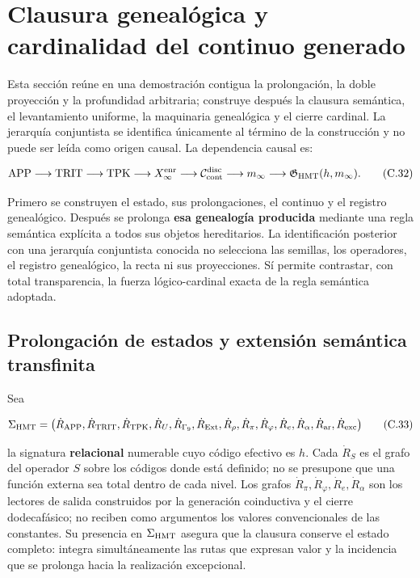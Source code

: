\section{Clausura genealógica y cardinalidad del continuo generado}
\label{sec:cierre-cardinal-nativo}

Esta sección reúne en una demostración contigua la prolongación, la doble
proyección y la profundidad arbitraria; construye después la clausura
semántica, el levantamiento uniforme, la maquinaria genealógica y el cierre
cardinal. La jerarquía conjuntista se identifica únicamente al término de la
construcción y no puede ser leída como origen causal. La dependencia causal es:

\[
 \mathrm{APP}\longrightarrow\mathrm{TRIT}\longrightarrow\mathrm{TPK}
 \longrightarrow X_\infty^{\rm enr}
 \longrightarrow\mathcal C_{\rm cont}^{\rm disc}
 \longrightarrow m_\infty
 \longrightarrow\mathfrak G_{\rm HMT}(h,m_\infty).
\tag{C.32}\label{eq:ch-cadena-causal}
\]

Primero se construyen el estado, sus prolongaciones, el continuo y el registro genealógico.
Después se prolonga \textbf{esa genealogía producida} mediante una regla semántica
explícita a todos sus objetos hereditarios. La identificación posterior con
una jerarquía conjuntista conocida no selecciona las semillas, los operadores,
el registro genealógico, la recta ni sus proyecciones. Sí permite contrastar, con total
transparencia, la fuerza lógico-cardinal exacta de la regla semántica adoptada.

\subsection{Prolongación de estados y extensión semántica transfinita}

Sea

\[
 \Sigma_{\rm HMT}
 =\bigl(\dot R_{\rm APP},\dot R_{\rm TRIT},\dot R_{\rm TPK},
 \dot R_{U},\dot R_{\Gamma_9},\dot R_{\rm Ext},\dot R_\rho,
 \dot R_{\pi},\dot R_{\varphi},\dot R_e,\dot R_{\alpha},
 \dot R_{\rm ar},\dot R_{\rm exc}\bigr)
\tag{C.33}\label{eq:ch-signatura}
\]

la signatura \textbf{relacional} numerable cuyo código efectivo es \(h\). Cada
\(\dot R_S\) es el grafo del operador \(S\) sobre los códigos donde está
definido; no se presupone que una función externa sea total dentro de cada
nivel. Los grafos \(\dot R_{\pi},\dot R_{\varphi},\dot R_e,\dot R_{\alpha}\)
son los lectores de salida construidos por la generación coinductiva y el
cierre dodecafásico; no reciben como argumentos los valores convencionales de
las constantes. Su presencia en \(\Sigma_{\rm HMT}\) asegura que la clausura
conserve el estado completo: integra simultáneamente las rutas que expresan
valor y la incidencia que se prolonga hacia la realización excepcional.

